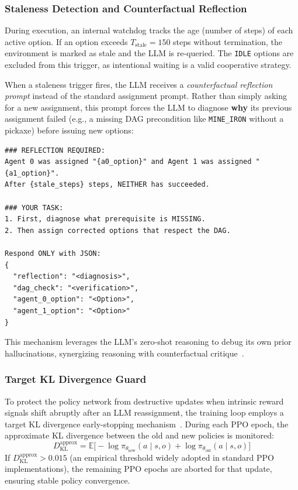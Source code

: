 \subsubsection{Staleness Detection and Counterfactual Reflection}
During execution, an internal watchdog tracks the age (number of steps) of each active option. If an option exceeds $T_{\text{stale}}=150$ steps without termination, the environment is marked as stale and the LLM is re-queried. The \texttt{IDLE} options are excluded from this trigger, as intentional waiting is a valid cooperative strategy.

When a staleness trigger fires, the LLM receives a \emph{counterfactual reflection prompt} instead of the standard assignment prompt. Rather than simply asking for a new assignment, this prompt forces the LLM to diagnose \textbf{why} its previous assignment failed (e.g., a missing DAG precondition like \texttt{MINE\_IRON} without a pickaxe) before issuing new options:

\begin{hegquote}
\begin{verbatim}
### REFLECTION REQUIRED:
Agent 0 was assigned "{a0_option}" and Agent 1 was assigned "{a1_option}".
After {stale_steps} steps, NEITHER has succeeded.

### YOUR TASK:
1. First, diagnose what prerequisite is MISSING.
2. Then assign corrected options that respect the DAG.

Respond ONLY with JSON:
{
  "reflection": "<diagnosis>",
  "dag_check": "<verification>",
  "agent_0_option": "<Option>",
  "agent_1_option": "<Option>"
}
\end{verbatim}
\end{hegquote}

This mechanism leverages the LLM's zero-shot reasoning to debug its own prior hallucinations, synergizing reasoning with counterfactual critique~\parencite{Yao_Zhao_Yu_Du_Shafran_Narasimhan_Cao_2023, Shinn_Cassano_Berman_Gopinath_Narasimhan_Yao_2023}.

\subsubsection{Target KL Divergence Guard}
To protect the policy network from destructive updates when intrinsic reward signals shift abruptly after an LLM reassignment, the training loop employs a target KL divergence early-stopping mechanism~\parencite{Schulman_Wolski_Dhariwal_Radford_Klimov_2017}. During each PPO epoch, the approximate KL divergence between the old and new policies is monitored:
\begin{equation}
\label{eq:approx_kl}
    D_{\text{KL}}^{\text{approx}}
    = \mathbb{E}\bigl[-\log \pi_{\theta_{\text{new}}}(a \mid s, o)
      + \log \pi_{\theta_{\text{old}}}(a \mid s, o)\bigr]
\end{equation}
If $D_{\text{KL}}^{\text{approx}} > 0.015$ (an empirical threshold widely adopted in standard PPO implementations), the remaining PPO epochs are aborted for that update, ensuring stable policy convergence.


